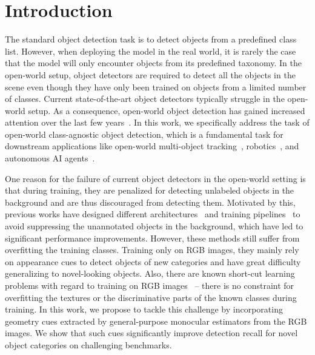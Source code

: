 \documentclass{article} \usepackage{iclr2023_conference,times}
\begin{document}
\section{Introduction}
The standard object detection task is to detect objects from a predefined class list. However, when deploying the model in the real world, it is rarely the case that the model will only encounter objects from its predefined taxonomy. In the open-world setup, object detectors are required to detect all the objects in the scene even though they have only been trained on objects from a limited number of classes. 
Current state-of-the-art object detectors typically struggle in the open-world setup. As a consequence, open-world object detection has gained increased attention over the last few years~\citep{jaiswal2021class, kim_learning_2021, joseph_towards_2021, wang2022open}.
In this work, we specifically address the task of open-world class-agnostic object detection, which is a fundamental task for downstream applications like open-world multi-object tracking~\citep{liu2022openingtracking}, robotics~\citep{jiang2019openrobots}, and autonomous AI agents~\citep{liu2021self}.


One reason for the failure of current object detectors in the open-world setting is that during training, they are penalized for detecting unlabeled objects in the background and are thus discouraged from detecting them.
Motivated by this, previous works have designed different architectures~\citep{kim_learning_2021, konan2022extending} and training pipelines~\citep{saito_learning_2021, wang2022open} to avoid suppressing the unannotated objects in the background, which have led to significant performance improvements. However, these methods still suffer from overfitting the training classes. 
Training only on RGB images, they mainly rely on appearance cues to detect objects of new categories and have great difficulty generalizing to novel-looking objects.
Also, there are known short-cut learning problems with regard to training on RGB images~\cite{geirhos2018, geirhos2020shortcut, sauer2021counterfactual} -- there is no constraint for overfitting the textures or the discriminative parts of the known classes during training.
In this work, we propose to tackle this challenge by incorporating geometry cues extracted by general-purpose monocular estimators from the RGB images. We show that such cues significantly improve detection recall for novel object categories on challenging benchmarks.
\end{document}
